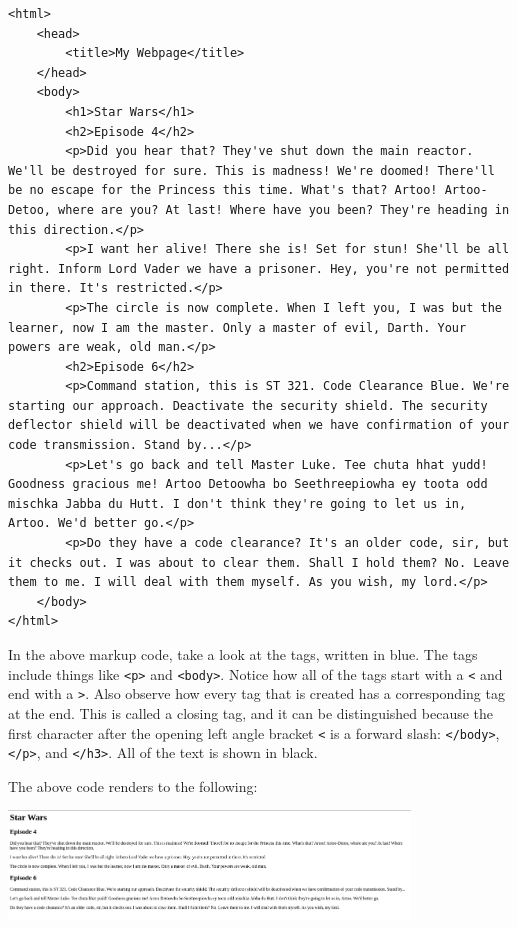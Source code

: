\begin{lstlisting}[style=HTML]
<html>
    <head>
        <title>My Webpage</title>
    </head>
    <body>
        <h1>Star Wars</h1>
        <h2>Episode 4</h2>
        <p>Did you hear that? They've shut down the main reactor. We'll be destroyed for sure. This is madness! We're doomed! There'll be no escape for the Princess this time. What's that? Artoo! Artoo-Detoo, where are you? At last! Where have you been? They're heading in this direction.</p>
        <p>I want her alive! There she is! Set for stun! She'll be all right. Inform Lord Vader we have a prisoner. Hey, you're not permitted in there. It's restricted.</p>
        <p>The circle is now complete. When I left you, I was but the learner, now I am the master. Only a master of evil, Darth. Your powers are weak, old man.</p>
        <h2>Episode 6</h2>
        <p>Command station, this is ST 321. Code Clearance Blue. We're starting our approach. Deactivate the security shield. The security deflector shield will be deactivated when we have confirmation of your code transmission. Stand by...</p>
        <p>Let's go back and tell Master Luke. Tee chuta hhat yudd! Goodness gracious me! Artoo Detoowha bo Seethreepiowha ey toota odd mischka Jabba du Hutt. I don't think they're going to let us in, Artoo. We'd better go.</p>
        <p>Do they have a code clearance? It's an older code, sir, but it checks out. I was about to clear them. Shall I hold them? No. Leave them to me. I will deal with them myself. As you wish, my lord.</p>
    </body>
</html>
\end{lstlisting}

In the above markup code, take a look at the tags, written in blue. The tags include things like \verb|<p>| and \verb|<body>|. Notice how all of the tags start with a \verb|<| and end with a \verb|>|. Also observe how every tag that is created has a corresponding tag at the end. This is called a closing tag, and it can be distinguished because the first character after the opening left angle bracket \verb|<| is a forward slash: \verb|</body>|, \verb|</p>|, and \verb|</h3>|. All of the text is shown in black.\par
The above code renders to the following:

\includegraphics[width=0.8\textwidth]{img/starwarshtml.png}

